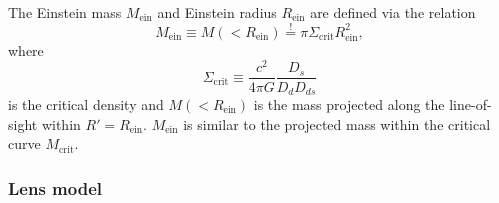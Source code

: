\documentclass[useAMS,usenatbib]{mnras}
\begin{document}
The Einstein mass $M_\text{ein}$ and Einstein radius $R_\text{ein}$ are defined via the relation
\begin{equation}
M_\text{ein} \equiv M(<R_\text{ein}) \overset{!}{=} \pi \Sigma_\text{crit} R_\text{ein}^2,
\end{equation}
where 
\begin{equation}
\Sigma_\text{crit} \equiv \frac{c^2}{4\pi G} \frac{D_s}{D_d D_{ds}}
\end{equation}
is the critical density and $M(<R_\text{ein})$ is the mass projected along the line-of-sight within $R'=R_\text{ein}$. $M_\text{ein}$ is similar to the projected mass within the critical curve $M_\text{crit}$.

\subsubsection{Lens model} 
\end{document}
